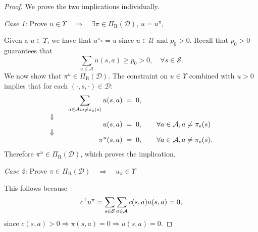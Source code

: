 \documentclass[10pt]{article}
\theoremstyle{plain}
\theoremstyle{remark}
\begin{document}
\lemmaOccupancyExistance*
\begin{proof}
We prove the two implications individually.

\emph{Case 1:} Prove $u \in \Upsilon   \quad \Rightarrow \quad  \exists
        \pi \in \Pi_{\mathrm{R}}(\mathcal{D}), \, u = u^{\pi}$,

Given a $u \in \Upsilon$, we have that $u^{\pi_{u}} = u$ since $u\in \mathcal{U}$ and $p_0 > 0$. Recall that $p_0 >0 $ guarantees that
\[
  \sum_{a\in \mathcal{A}} u(s,a) \ge  p_0 > 0, \quad \forall s\in \mathcal{S}.
\]
We now show that $\pi^u \in \Pi_{\mathrm{R}}(\mathcal{D})$. The constraint on $u\in \Upsilon$ combined with $u > 0$ implies that for each $(\cdot , s, \cdot ) \in \mathcal{D}$:
\begin{alignat*}{2}
  && \sum_{a\in \mathcal{A} : a \neq \pi_{\mathrm{e}}(s)} u(s,a) &\;=\; 0, \\
    \ArrowBetweenLines[\Downarrow]
  && u(s,a) &\; =\; 0, \qquad \forall a\in \mathcal{A}, a \neq  \pi_{\mathrm{e}}(s) \\
    \ArrowBetweenLines[\Downarrow]
  && \pi^u(s,a) &\;=\; 0,  \qquad \forall a\in \mathcal{A}, a \neq \pi_{\mathrm{e}}(s).
\end{alignat*}
Therefore $\pi^u\in \Pi_{\mathrm{R}}(\mathcal{D})$, which proves the implication. 

\emph{Case 2:} Prove $\pi \in \Pi_{\mathrm{R}}(\mathcal{D}) \quad \Rightarrow \quad  u_{\pi} \in
        \Upsilon $

This follows because
\[
 c^{\mathsf{T}} u^{\pi} = \sum_{s\in \mathcal{S}} \sum_{a\in \mathcal{A}} c(s,a) u(s,a) = 0, 
\]
since $c(s,a) > 0 \Rightarrow \pi(s,a) = 0 \Rightarrow u(s,a) = 0$.
\end{proof}
\end{document}
